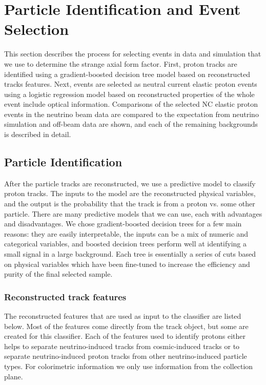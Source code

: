 \section{Particle Identification and Event Selection}\label{protonid}
\hspace{\parindent}
This section describes the process for selecting events in data and simulation
that we use to determine the strange axial form factor. First, proton tracks
are identified using a gradient-boosted decision tree model based on
reconstructed tracks features. Next, events are selected as neutral current
elastic proton events using a logistic regression model based on reconstructed
properties of the whole event include optical information. Comparisons of the
selected NC elastic proton events in the neutrino beam data are compared to the
expectation from neutrino simulation and off-beam data are shown, and each of
the remaining backgrounds is described in detail.

\subsection{Particle Identification}
  After the particle tracks are reconstructed, we use a predictive model to
  classify proton tracks. The inputs to the model are the reconstructed
  physical variables, and the output is the probability that the track is from
  a proton vs. some other particle. There are many predictive models that we
  can use, each with advantages and disadvantages. We chose gradient-boosted
  decision trees for a few main reasons: they are easily interpretable, the
  inputs can be a mix of numeric and categorical variables, and boosted
  decision trees perform well at identifying a small signal in a large
  background.  Each tree is essentially a series of cuts based on physical
  variables which have been fine-tuned to increase the efficiency and purity of
  the final selected sample.
  \subsubsection{Reconstructed track features}\label{sec:features}
    The reconstructed features that are used as input to the classifier are
    listed below. Most of the features come directly from the track object, but
    some are created for this classifier. Each of the features used to identify
    protons either helps to separate neutrino-induced tracks from
    cosmic-induced tracks or to separate neutrino-induced proton tracks from
    other neutrino-induced particle types. For colorimetric information we only
    use information from the collection plane.

